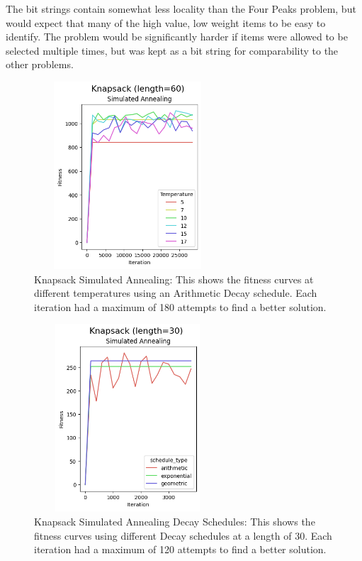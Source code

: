 \documentclass[letterpaper]{article} %
\begin{document}
The bit strings contain somewhat less locality than the Four Peaks problem, but would expect that many of the high value, low weight items to be easy to identify.  The problem would be significantly harder if items were allowed to be selected multiple times, but was kept as a bit string for comparability to the other problems.

\begin{figure}[htb]
\centering
\includegraphics[width=2.75in, height=2.75in]{figures/Knapsack_length=60_Simulated_Annealing_l_60_ma_180_d_arith_t_5__7__10__12__15__17_.png}
\caption{Knapsack Simulated Annealing: This shows the fitness curves at different temperatures using an Arithmetic Decay schedule. Each iteration had a maximum of 180 attempts to find a better solution. }
\label{fig:knapsack_sa}
\end{figure}

\begin{figure}[htb]
\centering
\includegraphics[width=2.75in, height=2.75in]{figures/Knapsack_length=30_Simulated_Annealing_l_30_ma_120_d_geom__arith__exp_t_10_.png}
\caption{Knapsack Simulated Annealing Decay Schedules: This shows the fitness curves using different Decay schedules at a length of 30. Each iteration had a maximum of 120 attempts to find a better solution. }
\label{fig:knapsack_sa_decay}
\end{figure}
\end{document}
